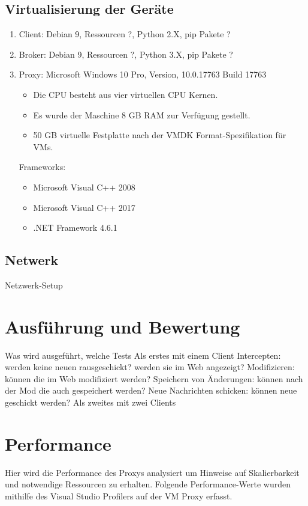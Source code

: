     \subsection{Virtualisierung der Geräte}
        \begin{enumerate}
            \item Client: Debian 9, Ressourcen ?, Python 2.X, pip Pakete ?
            \item Broker: Debian 9, Ressourcen ?, Python 3.X, pip Pakete ?
            \item Proxy: 
            Microsoft Windows 10 Pro, Version, 10.0.17763 Build 17763
            \begin{itemize}
                \item Die CPU besteht aus vier virtuellen CPU Kernen.
                \item Es wurde der Maschine 8 GB \ac{RAM} zur Verfügung gestellt.
                \item 50 GB virtuelle Festplatte nach der \ac{VMDK} Format-Spezifikation für \ac{VM}s.
            \end{itemize}
            Frameworks:
            \begin{itemize}
                \item Microsoft Visual C++ 2008
                \item Microsoft Visual C++ 2017
                \item .NET Framework 4.6.1
            \end{itemize}
        \end{enumerate}
    
    \subsection{Netwerk}
    Netzwerk-Setup
    
\section{Ausführung und Bewertung}
Was wird ausgeführt, welche Tests
Als erstes mit einem Client
    Intercepten: werden keine neuen rausgeschickt? werden sie im Web angezeigt?
    Modifizieren: können die im Web modifiziert werden?
    Speichern von Änderungen: können nach der Mod die auch gespeichert werden?
    Neue Nachrichten schicken: können neue geschickt werden?
Als zweites mit zwei Clients

\section{Performance}
    Hier wird die Performance des Proxys analysiert um Hinweise auf Skalierbarkeit und notwendige Ressourcen zu erhalten.
    Folgende Performance-Werte wurden mithilfe des Visual Studio Profilers auf der \ac{VM} Proxy erfasst.
    
